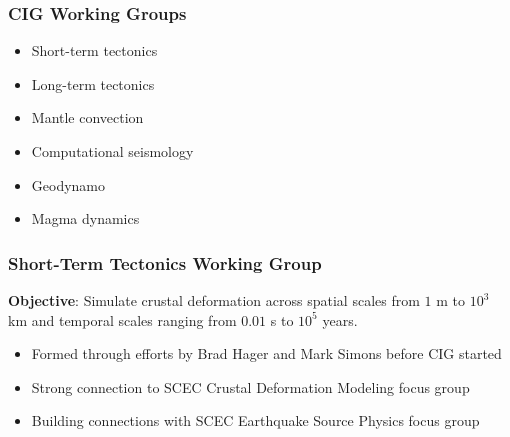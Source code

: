 \documentclass{beamer}
\begin{document}
\begin{frame}
  \frametitle{CIG Working Groups}
 
 \begin{itemize}
 \item Short-term tectonics
 \item Long-term tectonics
 \item Mantle convection
 \item Computational seismology
 \item Geodynamo
 \item Magma dynamics
 \end{itemize}

\end{frame}


\begin{frame}
  \frametitle{Short-Term Tectonics Working Group}
  \summary{}
 
 \vfill
 
 \textbf{Objective}: Simulate crustal deformation across spatial
 scales from $1$ m to $10^3$ km and temporal scales ranging from
 $0.01$ s to $10^5$ years.

 \vfill
 \begin{itemize}
 \item Formed through efforts by Brad Hager and Mark Simons before CIG started
 \item Strong connection to SCEC Crustal Deformation Modeling focus group
 \item Building connections with SCEC Earthquake Source Physics focus group
 \end{itemize}
\vfill

\end{frame} 
\end{document}
